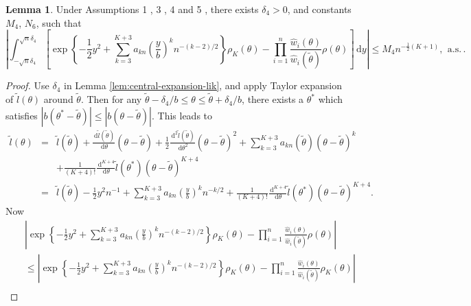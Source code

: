 \documentclass[oneside,english]{amsbook}
\numberwithin{section}{chapter}
\numberwithin{equation}{section}
\numberwithin{figure}{section}
\theoremstyle{plain}
\theoremstyle{plain}
\theoremstyle{definition}
\theoremstyle{plain}
\theoremstyle{plain}
\theoremstyle{remark}
\theoremstyle{definition}
\newtheorem{lemma}{Lemma}
\theoremstyle{definition}
\newcommand{\diff}{\,\mathrm{d}}
\newcommand{\ascv}{\,\mathrm{a.s.}\,}
\begin{document}
\begin{lemma}
\label{lem:central-expansion-post-prod}%
 Under  Assumptions 1 , 3 , 4 and 5 ,  there exists  $\delta_{4}>0$, and constants
$M_{4}$, $N_{6}$, such that 
\begin{equation}
\left|\int_{-\sqrt{n}\delta_{4}}^{\sqrt{n}\delta_{4}}\left[\exp\left\{ -\frac{1}{2}y^{2}+\sum_{k=3}^{K+3}a_{kn}\left(\frac{y}{b}\right)^{k}n^{-\left(k-2\right)/2}\right\} \rho_{K}\left(\theta\right)-\prod_{i=1}^{n}\frac{\hat{w}_{i}\left(\theta\right)}{\hat{w}_{i}\left(\tilde{\theta}\right)}\rho\left(\theta\right)\right]\diff y\right|\le M_{4}n^{-\frac{1}{2}\left(K+1\right)},\:\ascv.\label{eq:central-exp-post}
\end{equation}
\end{lemma}
\begin{proof}
Use $\delta_{4}$ in Lemma \ref{lem:central-expansion-lik}, and apply
Taylor expansion of $\tilde{l}\left(\theta\right)$ around $\tilde{\theta}$.
Then for any $\tilde{\theta}-\delta_{4}/b\le\theta\le\tilde{\theta}+\delta_{4}/b$,
there exists a $\theta^{*}$ which satisfies $\left|b\left(\theta^{*}-\tilde{\theta}\right)\right|\le\left|b\left(\theta-\tilde{\theta}\right)\right|$.
This leads to 
\begin{eqnarray*}
\tilde{l}\left(\theta\right) & = & \tilde{l}\left(\tilde{\theta}\right)+\frac{\diff\tilde{l}\left(\tilde{\theta}\right)}{\diff\theta}\left(\theta-\tilde{\theta}\right)+\frac{1}{2}\frac{\diff^{2}\tilde{l}\left(\tilde{\theta}\right)}{\diff\theta^{2}}\left(\theta-\tilde{\theta}\right)^{2}+\sum_{k=3}^{K+3}a_{kn}\left(\tilde{\theta}\right)\left(\theta-\tilde{\theta}\right)^{k}\\
 &  & +\frac{1}{\left(K+4\right)!}\frac{\diff^{K+4}}{\diff\theta}\tilde{l}\left(\theta^{*}\right)\left(\theta-\tilde{\theta}\right)^{K+4}\\
 & = & \tilde{l}\left(\tilde{\theta}\right)-\frac{1}{2}y^{2}n^{-1}+\sum_{k=3}^{K+3}a_{kn}\left(\frac{y}{b}\right)^{k}n^{-k/2}+\frac{1}{\left(K+4\right)!}\frac{\diff^{K+4}}{\diff\theta}\tilde{l}\left(\theta^{*}\right)\left(\theta-\tilde{\theta}\right)^{K+4}.
\end{eqnarray*}
Now 
\begin{eqnarray*}
 &  & \left|\exp\left\{ -\frac{1}{2}y^{2}+\sum_{k=3}^{K+3}a_{kn}\left(\frac{y}{b}\right)^{k}n^{-\left(k-2\right)/2}\right\} \rho_{K}\left(\theta\right)-\prod_{i=1}^{n}\frac{\hat{w}_{i}\left(\theta\right)}{\hat{w}_{i}\left(\tilde{\theta}\right)}\rho\left(\theta\right)\right|\\
 &  & \le\left|\exp\left\{ -\frac{1}{2}y^{2}+\sum_{k=3}^{K+3}a_{kn}\left(\frac{y}{b}\right)^{k}n^{-\left(k-2\right)/2}\right\} \rho_{K}\left(\theta\right)-\prod_{i=1}^{n}\frac{\hat{w}_{i}\left(\theta\right)}{\hat{w}_{i}\left(\tilde{\theta}\right)}\rho_{K}\left(\theta\right)\right|\\

\end{eqnarray*}
\end{proof}
\end{document}
